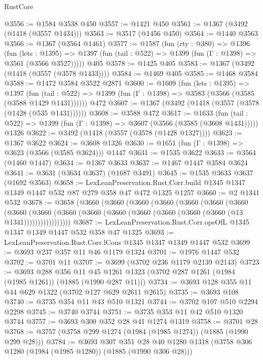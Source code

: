 \begin{lexlean}{RustCore}
\begin{coremodule}
@3556 := @1584 @3538 @450
@3557 := @1421 @450
@3561 := @1367 (@3492 (@1418 (@3557 @1434)))
@3563 := @3517 (@1456 @450)
@3564 := @1440 @3563
@3566 := @1367 (@3564 @1461)
@3577 := @1587
    (fun (rty : @380) =>
    @1396
      (fun (lets : @1395) =>
      @1397 (fun (tail : @522) => @1399 (fun (Γ : @1398) => @3561 (@3566 @3527)))))
    @405
@3578 := @1425 @405
@3583 := @1367 (@3492 (@1418 (@3557 (@3578 @1433))))
@3584 := @1469 @405
@3585 := @1468 @3584
@3588 := @1472 @3584 @3522 @2871
@3600 := @1609
    (fun (lets : @1395) =>
    @1397
      (fun (tail : @522) => @1399 (fun (Γ : @1398) => @3583 (@3566 (@3585 (@3588 @1429 @1431))))))
    @472
@3607 := @1367 (@3492 (@1418 (@3557 (@3578 (@1428 (@535 @1431))))))
@3608 := @3588 @472
@3617 := @1633
    (fun (tail : @522) => @1399 (fun (Γ : @1398) => @3607 (@3566 (@3585 (@3608 @1431)))))
    @1326
@3622 := @3492 (@1418 (@3557 (@3578 (@1428 @1327))))
@3623 := @1367 @3622
@3624 := @3608 @1326
@3630 := @1651 (fun (Γ : @1398) => @3623 (@3566 (@3585 @3624))) @1447
@3631 := @1535 @3622
@3633 := @3564 (@1460 @1447)
@3634 := @1367 @3633
@3637 := @1467 @1447 @3584 @3624
@3641 := @3631 (@3634 @3637) (@1687 @3491)
@3645 := @1535 @3633 @3637 (@1692 @3563)
@3658 := LexLeanPreservation.Rust.Corr.build
    @1345
    @1347
    @1349
    @1447
    @532
    @87
    @279
    @358
    @47
    @472
    @1325
    @1257
@3660 := @2 @1341 @532
@3678 := @3658
    (@3660
      (@3660
        (@3660
          (@3660
            (@3660
              (@3660
                (@3660
                  (@3660
                    (@3660
                      (@3660 (@3660 (@3660 (@3660 (@3660 (@3660 (@3660 (@13 @1341)))))))))))))))))
@3687 := LexLeanPreservation.Rust.Corr.opsOfL @1345 @1347 @1349 @1447 @532 @358 @47 @1325
@3693 := LexLeanPreservation.Rust.Corr.lCons @1345 @1347 @1349 @1447 @532
@3699 := @3693 @237 @357 @11 @46 @1179 @1324
@3701 := @1976 @1447 @532
@3702 := @3701 @11
@3707 := @3699 (@3702 @236 @1179 @2139 @2143)
@3723 := @3693
    @288
    @356
    @11
    @45
    @1261
    @1323
    (@3702 @287 @1261 (@1984 (@1985 @1261)) (@1885 (@1990 @287 @11)))
@3734 := @3693 @128 @355 @11 @44 @629 @1322 (@3702 @127 @629 @2611 @2615)
@3735 := @3693 @108
@3740 := @3735 @354 @11 @43 @510 @1321
@3744 := @3702 @107 @510 @2294 @2298
@3745 := @3740 @3744
@3751 := @3735 @353 @11 @42 @510 @1320 @3744
@3757 := @3693 @300 @352 @28 @41 @1274 @1319
@3758 := @3701 @28
@3768 := @3757 (@3758 @299 @1274 (@1984 (@1985 @1274)) (@1885 (@1990 @299 @28)))
@3784 := @3693
    @307
    @351
    @28
    @40
    @1280
    @1318
    (@3758 @306 @1280 (@1984 (@1985 @1280)) (@1885 (@1990 @306 @28)))

\end{coremodule}
\end{lexlean}

